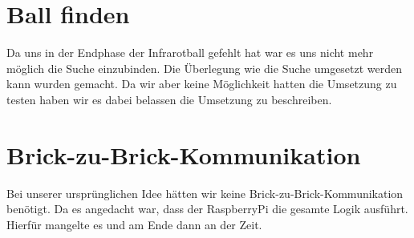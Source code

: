 \section{Ball finden}
Da uns in der Endphase der Infrarotball gefehlt hat war es uns nicht mehr möglich die Suche einzubinden. Die Überlegung wie die Suche umgesetzt werden kann wurden gemacht. Da wir aber keine Möglichkeit hatten die Umsetzung zu testen haben wir es dabei belassen die Umsetzung zu beschreiben.

\section{Brick-zu-Brick-Kommunikation}
Bei unserer ursprünglichen Idee hätten wir keine Brick-zu-Brick-Kommunikation benötigt. Da es angedacht war, dass der RaspberryPi die gesamte Logik ausführt. Hierfür mangelte es und am Ende dann an der Zeit. 

